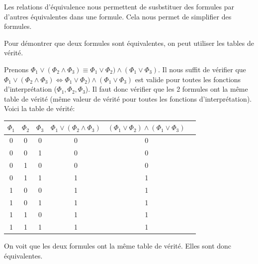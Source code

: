 Les relations d'équivalence nous permettent de susbstituer des formules par d'autres équivalentes dans une formule.
Cela nous permet de simplifier des formules.

Pour démontrer que deux formules sont équivalentes, on peut utiliser les tables de vérité. 
\begin{example}\leavevmode
  Prenons $\Phi_1 \vee (\Phi_2 \wedge \Phi_3) \equiv \Phi_1 \vee \Phi_2) \wedge (\Phi_1 \vee \Phi_3)$.
  Il nous suffit de vérifier que $\Phi_1 \vee (\Phi_2 \wedge \Phi_3) \iff \Phi_1 \vee \Phi_2) \wedge (\Phi_1 \vee \Phi_3)$ est valide 
  pour toutes les fonctions d'interprétation ($\Phi_1, \Phi_2, \Phi_3$). 
  Il faut donc vérifier que les 2 formules ont la même table de vérité (même valeur de vérité pour toutes les fonctions d'interprétation).
  Voici la table de vérité: 
  \begin{center}
    \begin{tabular}{|c|c|c|c|c|c|}
      \hline 
      $\Phi_1$ & $\Phi_2$ & $\Phi_3$ & $\Phi_1\vee(\Phi_2\wedge\Phi_3)$ & $(\Phi_1\vee\Phi_2)\wedge(\Phi_1\vee\Phi_3)$ \\ 
      \hline 
      0 & 0 & 0 & 0 & 0 \\ 
      \hline 
      0 & 0 & 1 & 0 & 0 \\ 
      \hline 
      0 & 1 & 0 & 0 & 0 \\ 
      \hline 
      0 & 1 & 1 & 1 & 1 \\ 
      \hline 
      1 & 0 & 0 & 1 & 1 \\ 
      \hline 
      1 & 0 & 1 & 1 & 1 \\ 
      \hline 
      1 & 1 & 0 & 1 & 1 \\ 
      \hline 
      1 & 1 & 1 & 1 & 1 \\ 
      \hline 
    \end{tabular} 
  \end{center} 
  On voit que les deux formules ont la même table de vérité. Elles sont donc équivalentes. 
\end{example}


